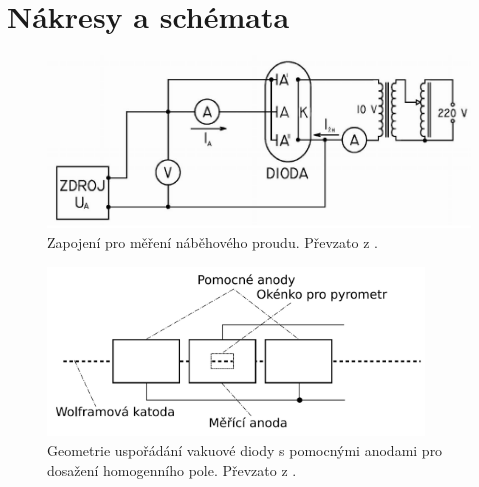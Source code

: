 \documentclass[english]{article}
\begin{document}
\section{Nákresy a schémata}
			\begin{figure}[h!]
			\centering
			\includegraphics[width=12cm]{att/pyromet2.png}
			\caption{Zapojení pro měření náběhového proudu. Převzato z \cite{bib:zadani}.}
			\label{fig:s_aparatura_nasyc}
			\end{figure}	
			
			\begin{figure}[h!]
			\centering
			\includegraphics[width=10cm]{att/pyromet.png}
			\caption{Geometrie uspořádání vakuové diody s pomocnými anodami pro dosažení homogenního pole. \newline Převzato z \cite{bib:zadani}.}
			\label{fig:s_dida}
			\end{figure}
	
\clearpage
\end{document}
